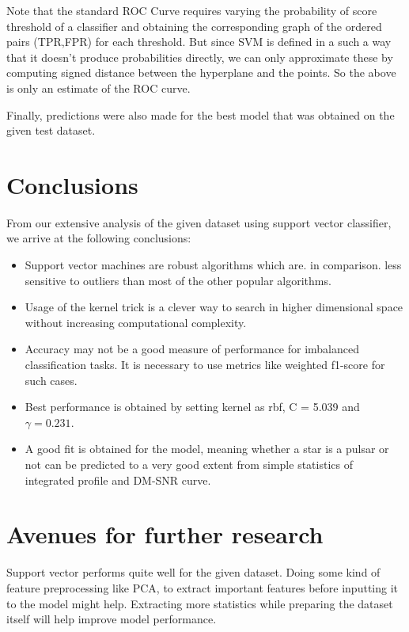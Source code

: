 \documentclass[conference]{IEEEtran}
\begin{document}
Note that the standard ROC Curve requires varying the probability of score threshold of a classifier and obtaining the corresponding graph of the ordered pairs (TPR,FPR) for
each threshold. But since SVM is defined in a such a way that it doesn't produce probabilities directly, we can only approximate these by computing signed distance between the hyperplane and the points. So the above is only an estimate of the ROC curve.

Finally, predictions were also made for the best model that was obtained on the given test dataset.


\section{Conclusions}

From our extensive analysis of the given dataset using support vector classifier, we arrive at the following conclusions:

\begin{itemize}
    \item Support vector machines are robust algorithms which are. in comparison. less sensitive to outliers than most of the other popular algorithms.
    \item Usage of the kernel trick is a clever way to search in higher dimensional space without increasing computational complexity.
    \item Accuracy may not be a good measure of performance for imbalanced classification tasks. It is necessary to use metrics like weighted f1-score for such cases.
    \item Best performance is obtained by setting kernel as rbf, C = 5.039 and $\gamma = 0.231$.
    \item A good fit is obtained for the model, meaning whether a star is a pulsar or not can be predicted to a very good extent from simple statistics of integrated profile and DM-SNR curve.
\end{itemize}



\section{Avenues for further research}

Support vector performs quite well for the given dataset. Doing some kind of feature preprocessing like PCA, to extract important features before inputting it to the model might help. Extracting more statistics while preparing the dataset itself will help improve model performance.  



\nocite{*} %

\end{document}
